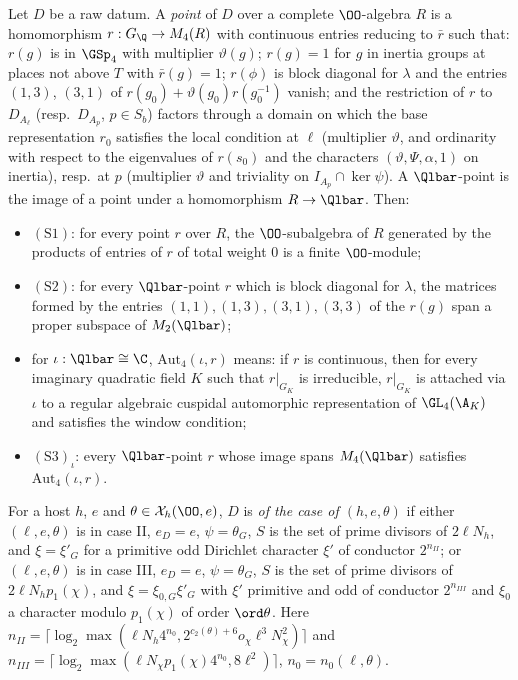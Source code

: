 \begin{definition}\label{pf:eis:rawpts}
Let $D$ be a raw datum. A \emph{point} of $D$ over a complete $\OO$-algebra $R$ is a homomorphism $r:G_\Q\to M_4(R)$ with continuous entries
reducing to $\bar r$ such that: $r(g)$ is in $\GSp_4$ with multiplier $\vartheta(g)$; $r(g)=1$ for $g$ in inertia groups at places not above
$T$ with $\bar r(g)=1$; $r(\phi)$ is block diagonal for $\lambda$ and the entries $(1,3)$, $(3,1)$ of $r(g_0)+\vartheta(g_0)r(g_0^{-1})$ vanish; and
the restriction of $r$ to $D_{A_\ell}$ (resp.\ $D_{A_p}$, $p\in S_b$) factors through a domain on which the base representation $r_0$ satisfies
the local condition at $\ell$ (multiplier $\vartheta$, and ordinarity with respect to the eigenvalues of $r(s_0)$ and the characters
$(\vartheta,\Psi,\alpha,1)$ on inertia), resp.\ at $p$ (multiplier $\vartheta$ and triviality on $I_{A_p}\cap\ker\psi$). A $\Qlbar$-point is the image of
a point under a homomorphism $R\to\Qlbar$. Then:
\begin{itemize}
\item $(\mathrm{S1})$: for every point $r$ over $R$, the $\OO$-subalgebra of $R$ generated by the products of entries of $r$ of total
  weight $0$ is a finite $\OO$-module;
\item $(\mathrm{S2})$: for every $\Qlbar$-point $r$ which is block diagonal for $\lambda$, the matrices formed by the entries
  $(1,1),(1,3),(3,1),(3,3)$ of the $r(g)$ span a proper subspace of $M_2(\Qlbar)$;
\item for $\iota:\Qlbar\cong\C$, $\mathrm{Aut}_4(\iota,r)$ means: if $r$ is continuous, then for every imaginary quadratic field $K$ such that
  $r|_{G_K}$ is irreducible, $r|_{G_K}$ is attached via $\iota$ to a regular algebraic cuspidal automorphic representation of $\GL_4(\A_K)$
  and satisfies the window condition;
\item $(\mathrm{S3})_\iota$: every $\Qlbar$-point $r$ whose image spans $M_4(\Qlbar)$ satisfies $\mathrm{Aut}_4(\iota,r)$.
\end{itemize}
For a host $h$, $e$ and $\theta\in\eisX_h(\OO,e)$, $D$ is \emph{of the case of $(h,e,\theta)$} if either $(\ell,e,\theta)$ is in case II, $e_D=e$,
$\psi=\theta_G$, $S$ is the set of prime divisors of $2\ell N_h$, and $\xi=\xi'_G$ for a primitive odd Dirichlet character $\xi'$ of conductor
$2^{n_{II}}$; or $(\ell,e,\theta)$ is in case III, $e_D=e$, $\psi=\theta_G$, $S$ is the set of prime divisors of $2\ell N_hp_1(\chi)$, and
$\xi=\xi_{0,G}\xi'_G$ with $\xi'$ primitive and odd of conductor $2^{n_{III}}$ and $\xi_0$ a character modulo $p_1(\chi)$ of order $\ord\theta$.
Here $n_{II}=\lceil\log_2\max(\ell N_h4^{n_0},2^{c_2(\theta)+6}o_\chi\ell^3N_\chi^2)\rceil$ and
$n_{III}=\lceil\log_2\max(\ell N_\chi p_1(\chi)4^{n_0},8\ell^2)\rceil$, $n_0=n_0(\ell,\theta)$.
\end{definition}

